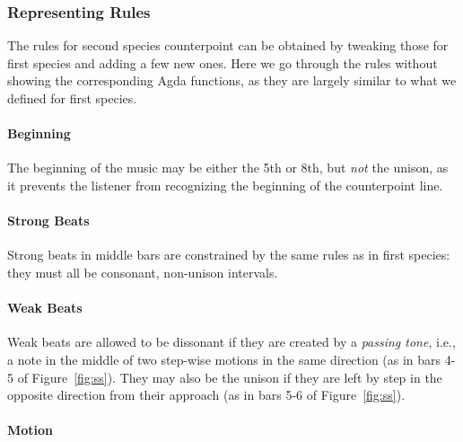 \subsubsection{Representing Rules}

The rules for second species counterpoint can be obtained by
tweaking those for first species and adding a few new ones.
Here we go through the rules without showing the corresponding
Agda functions, as they are largely similar to what we defined for
first species.

\paragraph{Beginning}

The beginning of the music may be either the 5th or 8th, but
\emph{not} the unison, as it prevents the listener from recognizing
the beginning of the counterpoint line.

\paragraph{Strong Beats}

Strong beats in middle bars are constrained by the same rules as in
first species: they must all be consonant, non-unison intervals.

\paragraph{Weak Beats}

Weak beats are allowed to be dissonant if they are created by a
\emph{passing tone}, i.e., a note in the middle of two step-wise
motions in the same direction (as in bars 4-5 of Figure~\ref{fig:ss}).
They may also be the unison if they are left by step in the opposite
direction from their approach (as in bars 5-6 of Figure~\ref{fig:ss}).

\paragraph{Motion}

